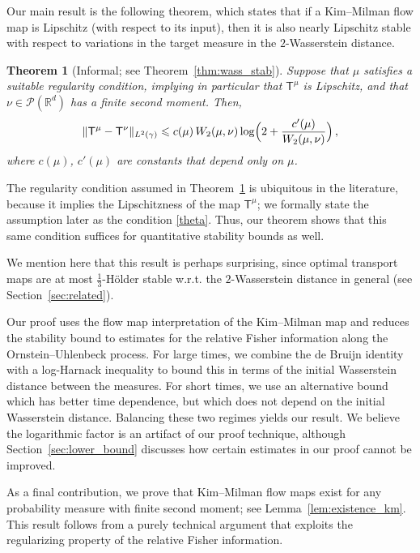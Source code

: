 \documentclass[12pt]{article}
\newcommand{\cP}{\mathcal{P}}
\newcommand{\1}{\mathds{1}}
\renewcommand{\le}{\leqslant}
\newcommand{\KM}{\mathsf T}
\theoremstyle{plain}
\newtheorem{theorem}{Theorem}[section]
\theoremstyle{definition}
\theoremstyle{remark}
\begin{document}
Our main result is the following theorem, which states that if a Kim--Milman flow map is Lipschitz (with respect to its input), then it is also nearly Lipschitz stable with respect to variations in the target measure in the $2$-Wasserstein distance.
\begin{theorem}[Informal; see Theorem~\ref{thm:wass_stab}]\label{thm:intro}
Suppose that $\mu$ satisfies a suitable regularity condition, implying in particular that $\mathsf T^\mu$ is Lipschitz, and that $\nu \in \cP(\mathbb{R}^d)$ has a finite second moment. Then,
\begin{align*}
    \|\mathsf T^\mu - \mathsf T^\nu\|_{L^2(\gamma)} \le c(\mu)\, W_2(\mu,\nu) \log\Bigl(2 + \frac{c'(\mu)}{W_2(\mu,\nu)}\Bigr)\,, 
\end{align*}
where $c(\mu)$, $c'(\mu)$ are constants that depend only on $\mu$.
\end{theorem}
The regularity condition assumed in Theorem~\ref{thm:intro} is ubiquitous in the literature, because it implies the Lipschitzness of the map $\KM^\mu$; we formally state the assumption later as the condition \eqref{theta}.
Thus, our theorem shows that this same condition suffices for quantitative stability bounds as well.

We mention here that this result is perhaps surprising, since optimal transport maps are at most $\frac{1}{3}$-H\"older stable {w.r.t. the $2$-Wasserstein distance} in general (see Section~\ref{sec:related}). 

Our proof uses the flow map interpretation of the Kim{--}Milman map and reduces the stability bound to estimates for the relative Fisher information along the Ornstein--Uhlenbeck process. For large times, we combine the de Bruijn identity with a log-Harnack inequality to bound this in terms of the initial Wasserstein distance between the measures. For short times, we use an alternative bound which has better time dependence, but which does not depend on the initial Wasserstein distance. Balancing these two regimes yields our result. We believe the logarithmic factor is an artifact of our proof technique, although Section~\ref{sec:lower_bound} discusses how certain estimates in our proof cannot be improved. 

As a final contribution, we prove that Kim--Milman flow maps exist for any probability measure with finite second moment; see Lemma~\ref{lem:existence_km}. This result follows from a purely technical argument that exploits the regularizing property of the relative Fisher information.
\end{document}
